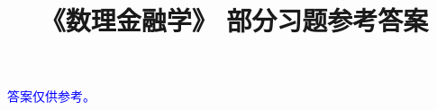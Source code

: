 \documentclass[UTF8]{ctexart}
\title{\Large\heiti 《数理金融学》 部分习题参考答案\vspace{-3em}}
\date{}
\begin{document}
    \maketitle
    \begin{center}
        {\Large\textcolor{blue}{答案仅供参考。}}
    \end{center}
    \tableofcontents
    \clearpage
    
    
    
    
    
    
    
    
    
\end{document}

